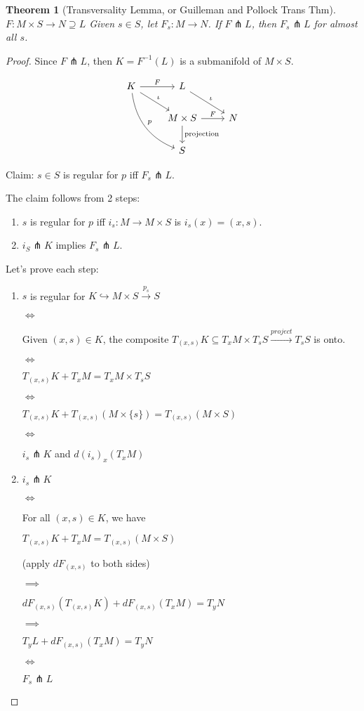 \documentclass[11pt]{amsbook}
\theoremstyle{mystyle} \newtheorem{thrm}[thm]{Theorem}
\theoremstyle{mystyle} \newtheorem{defi}[thm]{Definition}
\theoremstyle{mystyle} \newtheorem{coro}[thm]{Corollary}
\theoremstyle{mystyle} \newtheorem{propo}[thm]{Proposition}
\theoremstyle{mystyle} \newtheorem{lemm}[thm]{Lemma}
\numberwithin{thm}{section}
\newcommand{\transverse}{\pitchfork}
\newcommand{\into}{\hookrightarrow}
\newcommand{\x}{\times}
\begin{document}
\begin{thrm}[Transversality Lemma, or Guilleman and Pollock Trans Thm]
	$F: M \x S \to N \supseteq L$
	Given $s \in S$, let $F_s: M \to N$.
	If $F \transverse L$, then $F_s \transverse L$ for almost all $s$.
\end{thrm}
\begin{proof}
	Since $F \transverse L$, then $K = F^{-1}(L)$ is a submanifold of $M \x S$.

	$$\begin{tikzcd}
		K \arrow[r, "F"] \arrow[rd, "\iota"] \arrow[rdd, "p", bend right] & L \arrow[rd, "\iota"] \\
		 & M \x S \arrow[r, "F"] \arrow[d, "\text{projection}"] & N \\
		 & S
	\end{tikzcd}$$

	Claim: $s \in S$ is regular for $p$ iff $F_s \transverse L$.

	The claim follows from 2 steps:
	\begin{enumerate}
		\item $s$ is regular for $p$ iff $i_s: M \to M \x S$ is $i_s(x) = (x,s)$.
		\item $i_S \transverse K$ implies $F_s \transverse L$.
	\end{enumerate}

	Let's prove each step:
	\begin{enumerate}
		\item
			$s$ is regular for $K \into M \x S \overset{p_s}{\to} S$

			$\iff$

			Given $(x,s) \in K$, the composite $T_{(x,s)}K \subseteq T_xM \x T_sS \overset{project}{\to} T_sS$ is onto.

			$\iff$

			$T_{(x,s)}K + T_xM = T_xM \x T_sS$

			$\iff$

			$T_{(x,s)}K + T_{(x,s)}(M \x \{s\}) = T_{(x,s)}(M \x S)$

			$\iff$

			$i_s \transverse K$ and $d(i_s)_x(T_xM)$
		\item
			$i_s \transverse K$

			$\iff$

			For all $(x,s) \in K$, we have

			$T_{(x,s)}K + T_xM = T_{(x,s)}(M \x S)$

			(apply $dF_{(x,s)}$ to both sides)

			$\implies$

			$dF_{(x,s)}(T_{(x,s)}K) + dF_{(x,s)}(T_xM) = T_yN$

			$\implies$

			$T_yL + dF_{(x,s)}(T_xM) = T_yN$

			$\iff$

			$F_s \transverse L$
	\end{enumerate}
\end{proof}
\end{document}
